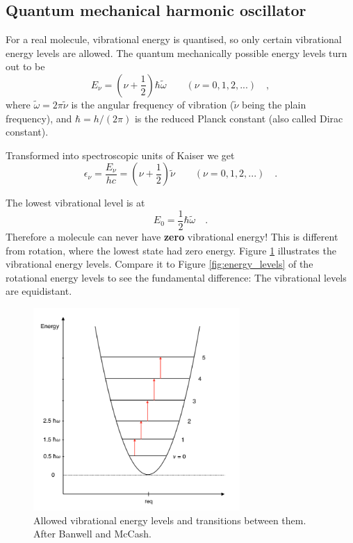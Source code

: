 \subsection{Quantum mechanical harmonic oscillator} 
For a real molecule, vibrational energy is quantised, so only certain
vibrational energy levels are allowed. The quantum mechanically possible energy levels turn out to be 
\begin{equation}
E_\nu = (\nu+\frac{1}{2})\hbar\tilde{\omega} \qquad (\nu = 0, 1, 2, ...) \quad ,
\end{equation}
where $\tilde{\omega} = 2 \pi \tilde{\nu}$ is the angular frequency of
vibration ($\tilde{\nu}$ being the plain frequency), and $\hbar =
h/(2\pi)$ is the reduced Planck constant (also called Dirac constant).

Transformed into spectroscopic units of Kaiser we get
\begin{equation}
\epsilon_\nu = \frac{E_\nu}{hc} = (\nu + \frac{1}{2})\tilde{\nu} \qquad (\nu = 0, 1, 2, ...) \quad .
\end{equation}

The lowest vibrational level is at
\begin{equation}
E_0 = \frac{1}{2} \hbar \tilde{\omega} \quad .
\end{equation}
Therefore a molecule can never have \textbf{zero} vibrational energy!
This is different from rotation, where the lowest state had zero
energy. Figure \ref{Vibration_parabol_2} illustrates the vibrational
energy levels. Compare it to Figure \ref{fig:energy_levels} of the
rotational energy levels to see the fundamental difference: The
vibrational levels are equidistant.

\begin{figure}
\begin{center}
\includegraphics[width=0.7\textwidth]{figures/Vibration_parabol_2}
\caption{Allowed vibrational energy levels and transitions between them. After Banwell and McCash.}
\label{Vibration_parabol_2}
\end{center}
\end{figure}

